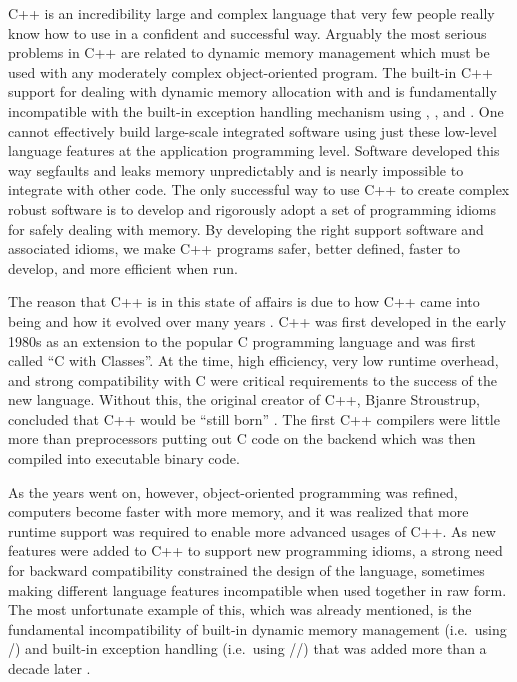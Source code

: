 \documentclass[pdf,ps2pdf,11pt]{SANDreport}
\begin{document}
C++ is an incredibility large and complex language that very few
people really know how to use in a confident and successful way.
Arguably the most serious problems in C++ are related to dynamic
memory management which must be used with any moderately complex
object-oriented program.  The built-in C++ support for dealing with
dynamic memory allocation with {} and {} is
fundamentally incompatible with the built-in exception handling
mechanism using {}, {}, and {}.  One
cannot effectively build large-scale integrated software using just
these low-level language features at the application programming
level.  Software developed this way segfaults and leaks memory
unpredictably and is nearly impossible to integrate with other code.
The only successful way to use C++ to create complex robust software
is to develop and rigorously adopt a set of programming idioms for
safely dealing with memory.  By developing the right support software
and associated idioms, we make C++ programs safer, better defined,
faster to develop, and more efficient when run.

The reason that C++ is in this state of affairs is due to how C++ came
into being and how it evolved over many years {}\cite{stroustrup94,
stroustrup07}.  C++ was first developed in the early 1980s as an
extension to the popular C programming language and was first called
``C with Classes''.  At the time, high efficiency, very low runtime
overhead, and strong compatibility with C were critical requirements
to the success of the new language.  Without this, the original
creator of C++, Bjanre Stroustrup, concluded that C++ would be ``still
born'' {}\cite{stroustrup97}.  The first C++ compilers were little
more than preprocessors putting out C code on the backend which was
then compiled into executable binary code.

As the years went on, however, object-oriented programming was
refined, computers become faster with more memory, and it was realized
that more runtime support was required to enable more advanced usages
of C++.  As new features were added to C++ to support new programming
idioms, a strong need for backward compatibility constrained the
design of the language, sometimes making different language features
incompatible when used together in raw form.  The most unfortunate
example of this, which was already mentioned, is the fundamental
incompatibility of built-in dynamic memory management (i.e.\ using
{}/{}) and built-in exception handling (i.e.\
using {}/{}/{}) that was added more
than a decade later {}\cite{stroustrup94}.
\end{document}
